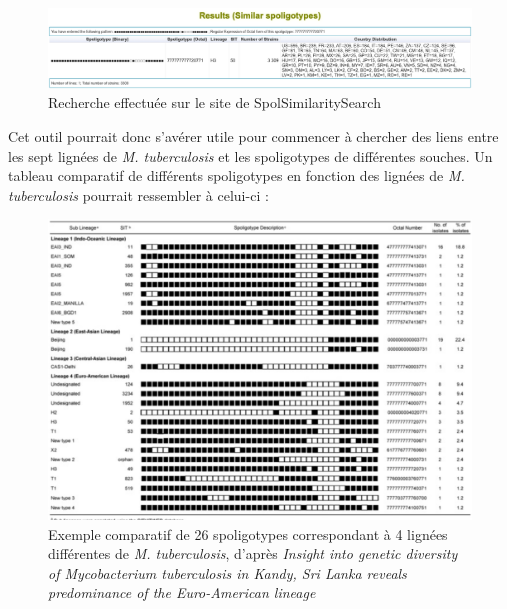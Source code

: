 \documentclass[twoside,a4paper,11pt,frenchb,openany]{report}
\begin{document}
\begin{figure}[h!]
\centering
\includegraphics[scale=0.37]{spolsimilarity.png}
\caption{Recherche effectuée sur le site de SpolSimilaritySearch}
\end{figure}

Cet outil pourrait donc s'avérer utile pour commencer à chercher des liens entre les sept lignées de \textit{M. tuberculosis} et les spoligotypes de différentes souches.
Un tableau comparatif de différents spoligotypes en fonction des lignées de \textit{M. tuberculosis} pourrait ressembler à celui-ci :

\begin{figure}[h!]
\centering
\includegraphics[scale=0.4]{comparaison.png}
\caption{Exemple comparatif de 26 spoligotypes correspondant à 4 lignées différentes de \textit{M. tuberculosis}, d'après \textit{Insight into genetic diversity of Mycobacterium tuberculosis in Kandy, Sri Lanka reveals predominance of the Euro-American lineage}}
\end{figure}
\end{document}

